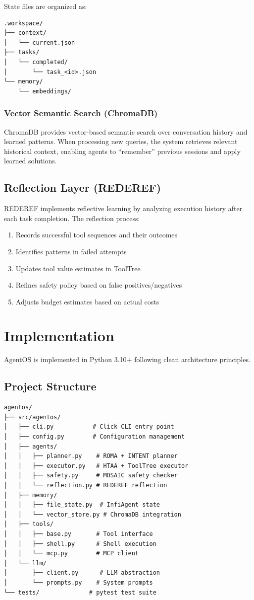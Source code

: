 \documentclass[12pt,a4paper]{article}
\begin{document}
State files are organized as:
\begin{verbatim}
.workspace/
├── context/
│   └── current.json
├── tasks/
│   └── completed/
│       └── task_<id>.json
└── memory/
    └── embeddings/
\end{verbatim}

\subsubsection{Vector Semantic Search (ChromaDB)}

ChromaDB provides vector-based semantic search over conversation history and learned patterns. When processing new queries, the system retrieves relevant historical context, enabling agents to ``remember'' previous sessions and apply learned solutions.

\subsection{Reflection Layer (REDEREF)}

REDEREF implements reflective learning by analyzing execution history after each task completion. The reflection process:

\begin{enumerate}
    \item Records successful tool sequences and their outcomes
    \item Identifies patterns in failed attempts
    \item Updates tool value estimates in ToolTree
    \item Refines safety policy based on false positives/negatives
    \item Adjusts budget estimates based on actual costs
\end{enumerate}

\section{Implementation}

AgentOS is implemented in Python 3.10+ following clean architecture principles.

\subsection{Project Structure}

\begin{verbatim}
agentos/
├── src/agentos/
│   ├── cli.py           # Click CLI entry point
│   ├── config.py        # Configuration management
│   ├── agents/
│   │   ├── planner.py    # ROMA + INTENT planner
│   │   ├── executor.py   # HTAA + ToolTree executor
│   │   ├── safety.py     # MOSAIC safety checker
│   │   └── reflection.py # REDEREF reflection
│   ├── memory/
│   │   ├── file_state.py  # InfiAgent state
│   │   └── vector_store.py # ChromaDB integration
│   ├── tools/
│   │   ├── base.py       # Tool interface
│   │   ├── shell.py      # Shell execution
│   │   └── mcp.py        # MCP client
│   └── llm/
│       ├── client.py      # LLM abstraction
│       └── prompts.py    # System prompts
└── tests/              # pytest test suite
\end{verbatim}
\end{document}
